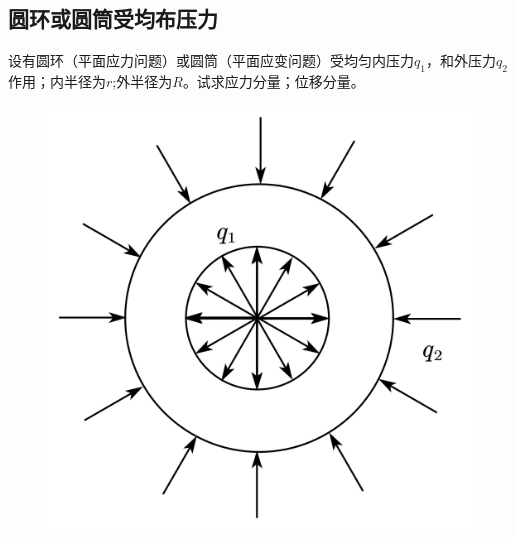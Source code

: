 \subsection{圆环或圆筒受均布压力}
\begin{example}
设有圆环（平面应力问题）或圆筒（平面应变问题）受均匀内压力$q_1$，和外压力$q_2$作用；内半径为$r$;外半径为$R$。试求应力分量；位移分量。
\end{example}
\begin{figure}[!h]
	\centering
	\includegraphics[scale=0.3]{figure/4-5.png}
\end{figure}
